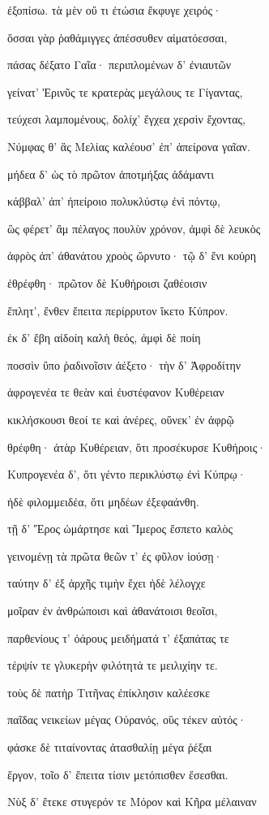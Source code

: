 \begin{pages}
\begin{Leftside}
ἐξοπίσω. τὰ μὲν οὔ τι ἐτώσια ἔκφυγε χειρός· 

ὅσσαι γὰρ ῥαθάμιγγες ἀπέσσυθεν αἱματόεσσαι,

πάσας δέξατο Γαῖα· περιπλομένων δ' ἐνιαυτῶν 

γείνατ' Ἐρινῦς τε κρατερὰς μεγάλους τε Γίγαντας, 

τεύχεσι λαμπομένους, δολίχ' ἔγχεα χερσὶν ἔχοντας,

Νύμφας θ' ἃς Μελίας καλέουσ' ἐπ' ἀπείρονα γαῖαν. 

μήδεα δ' ὡς τὸ πρῶτον ἀποτμήξας ἀδάμαντι

κάββαλ' ἀπ' ἠπείροιο πολυκλύστῳ ἐνὶ πόντῳ,

ὣς φέρετ' ἂμ πέλαγος πουλὺν χρόνον, ἀμφὶ δὲ λευκὸς 

ἀφρὸς ἀπ' ἀθανάτου χροὸς ὤρνυτο· τῷ δ' ἔνι κούρη 

ἐθρέφθη· πρῶτον δὲ Κυθήροισι ζαθέοισιν 

ἔπλητ', ἔνθεν ἔπειτα περίρρυτον ἵκετο Κύπρον.

ἐκ δ' ἔβη αἰδοίη καλὴ θεός, ἀμφὶ δὲ ποίη

ποσσὶν ὕπο ῥαδινοῖσιν ἀέξετο· τὴν δ' Ἀφροδίτην  

ἀφρογενέα τε θεὰν καὶ ἐυστέφανον Κυθέρειαν

κικλήσκουσι θεοί τε καὶ ἀνέρες, οὕνεκ' ἐν ἀφρῷ

θρέφθη· ἀτὰρ Κυθέρειαν, ὅτι προσέκυρσε Κυθήροις· 

Κυπρογενέα δ', ὅτι γέντο περικλύστῳ ἐνὶ Κύπρῳ·

ἠδὲ φιλομμειδέα, ὅτι μηδέων ἐξεφαάνθη. 

τῇ δ' Ἔρος ὡμάρτησε καὶ Ἵμερος ἔσπετο καλὸς

γεινομένῃ τὰ πρῶτα θεῶν τ' ἐς φῦλον ἰούσῃ· 

ταύτην δ' ἐξ ἀρχῆς τιμὴν ἔχει ἠδὲ λέλογχε

μοῖραν ἐν ἀνθρώποισι καὶ ἀθανάτοισι θεοῖσι,

παρθενίους τ' ὀάρους μειδήματά τ' ἐξαπάτας τε 

τέρψίν τε γλυκερὴν φιλότητά τε μειλιχίην τε.

τοὺς δὲ πατὴρ Τιτῆνας ἐπίκλησιν καλέεσκε

παῖδας νεικείων μέγας Οὐρανός, οὓς τέκεν αὐτός· 

φάσκε δὲ τιταίνοντας ἀτασθαλίῃ μέγα ῥέξαι

ἔργον, τοῖο δ' ἔπειτα τίσιν μετόπισθεν ἔσεσθαι. 

Νὺξ δ' ἔτεκε στυγερόν τε Μόρον καὶ Κῆρα μέλαιναν 


\end{Leftside}
\end{pages}
